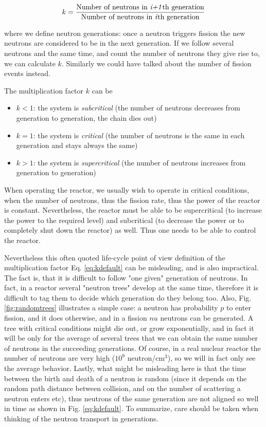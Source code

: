 \begin{equation}\label{eq:kdefault}
k=\frac{\text{Number of neutrons in \textit{i+1}th generation}}{\text{Number of neutrons in \textit{i}th generation}}
\end{equation}

where we define neutron generations: once a neutron triggers fission the new neutrons are considered to be in the next generation. If we follow several neutrons and the same time, and count the number of neutrons they give rise to, we can calculate $k$. Similarly we could have talked about the number of fission events instead. 

The multiplication factor $k$ can be

\begin{itemize}
\item $k<1$: the system is \textit{subcritical} (the number of neutrons decreases from generation to generation, the chain dies out)
\item $k=1$: the system is \textit{critical} (the number of neutrons is the same in each generation and stays always the same)
\item $k>1$: the system is \textit{supercritical} (the number of neutrons increases from generation to generation)
\end{itemize}

When operating the reactor, we usually wish to operate in critical conditions, when the number of neutrons, thus the fission rate, thus the power of the reactor is constant. Nevertheless, the reactor must be able to be supercritical (to increase the power to the required level) and subcritical (to decrease the power or to completely shut down the reactor) as well. Thus one needs to be able to control the reactor.

Nevertheless this often quoted life-cycle point of view definition of the multiplication factor Eq. \ref{eq:kdefault} can be misleading, and is also impractical. The fact is, that it is difficult to follow "one given" generation of neutrons. In fact, in a reactor several "neutron trees" develop at the same time, therefore it is difficult to tag them to decide which generation do they belong too. Also, Fig. \ref{fig:randomtrees} illustrates a simple case: a neutron has probability $p$ to enter fission, and it does otherwise, and in a fission $nu$ neutrons can be generated. A tree with critical conditions might die out, or grow exponentially, and in fact it will be only for the average of several trees that we can obtain the same number of neutrons in the succeeding generations. Of course, in a real nuclear reactor the number of neutrons are very high ($10^9$ neutron/cm$^3$), so we will in fact only see the average behavior. Lastly, what might be misleading here is that the time between the birth and death of a neutron is random (since it depends on the random path distance between collision, and on the number of scattering a neutron enters etc), thus neutrons of the same generation are not aligned so well in time as shown in Fig. \ref{eq:kdefault}. To summarize, care should be taken when thinking of the neutron transport in generations. 

